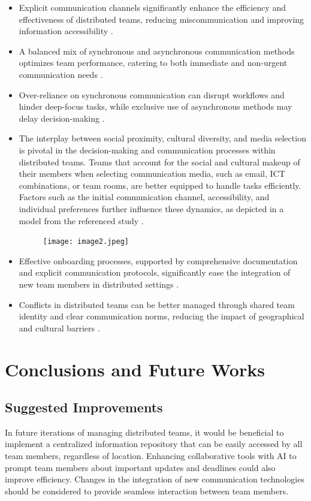 \documentclass[12pt]{article}
\begin{document}
\begin{itemize}
    \item Explicit communication channels significantly enhance the efficiency and effectiveness of distributed teams, reducing miscommunication and improving information accessibility \cite{ref1}.
    \item A balanced mix of synchronous and asynchronous communication methods optimizes team performance, catering to both immediate and non-urgent communication needs \cite{ref5}.
    \item Over-reliance on synchronous communication can disrupt workflows and hinder deep-focus tasks, while exclusive use of asynchronous methods may delay decision-making \cite{ref2}.
    \item The interplay between social proximity, cultural diversity, and media selection is pivotal in the decision-making and communication processes within distributed teams. Teams that account for the social and cultural makeup of their members when selecting communication media, such as email, ICT combinations, or team rooms, are better equipped to handle tasks efficiently. Factors such as the initial communication channel, accessibility, and individual preferences further influence these dynamics, as depicted in a model from the referenced study \cite{ref8}.
    \begin{figure}[h]
        \centering
        \texttt{[image: image2.jpeg]}
        \label{fig:image2}
    \end{figure}
    \item Effective onboarding processes, supported by comprehensive documentation and explicit communication protocols, significantly ease the integration of new team members in distributed settings \cite{ref7}.
    \item Conflicts in distributed teams can be better managed through shared team identity and clear communication norms, reducing the impact of geographical and cultural barriers \cite{ref10}.
\end{itemize}

\section{Conclusions and Future Works}

\subsection{Suggested Improvements}
In future iterations of managing distributed teams, it would be beneficial to implement a centralized information repository that can be easily accessed by all team members, regardless of location. Enhancing collaborative tools with AI to prompt team members about important updates and deadlines could also improve efficiency. Changes in the integration of new communication technologies should be considered to provide seamless interaction between team members.
\end{document}
